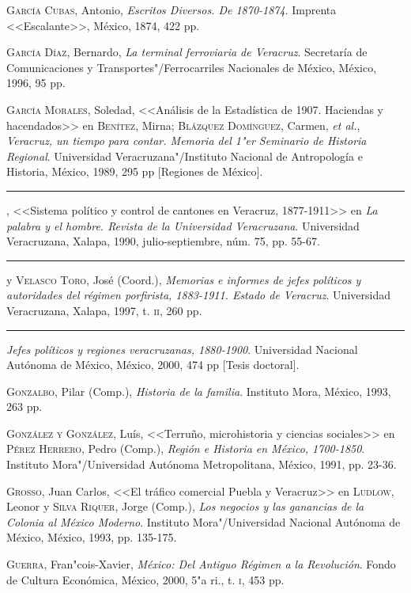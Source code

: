 \documentclass[14pt,twoside,final]{extbook} %
\begin{document}
\textsc{García Cubas}, Antonio, \emph{Escritos Diversos. De 1870-1874}. Imprenta <<Escalante>>, México, 1874, 422 pp.

\textsc{García Díaz}, Bernardo, \emph{La terminal ferroviaria de Veracruz}. Secretaría de Comunicaciones y Transportes"/Ferrocarriles Nacionales de México, México, 1996, 95 pp.

\textsc{García Morales}, Soledad, <<Análisis de la Estadística de 1907. Haciendas y
hacendados>> en \textsc{Benítez}, Mirna; \textsc{Blázquez Domínguez}, Carmen,
\emph{et al.}, \emph{Veracruz, un tiempo para contar. Memoria del 1"er Seminario de Historia Regional}. Universidad Veracruzana"/Instituto Nacional de Antropología e Historia, México, 1989, 295 pp [Regiones de México].

\rule{1cm}{0.4pt}, <<Sistema político y control de cantones en Veracruz, 1877-1911>> en \emph{La palabra y el hombre. Revista de la Universidad Veracruzana}. Universidad Veracruzana, Xalapa, 1990, julio-septiembre, núm. 75, pp. 55-67.

\rule{1cm}{0.4pt} y \textsc{Velasco Toro}, José (Coord.), \emph{Memorias e informes de jefes políticos y autoridades del régimen porfirista, 1883-1911. Estado de Veracruz}. Universidad
Veracruzana, Xalapa, 1997, t. \textsc{ii}, 260 pp.

\rule{1cm}{0.4pt} \emph{Jefes políticos y regiones veracruzanas, 1880-1900}. Universidad Nacional Autónoma de México, México, 2000, 474 pp [Tesis doctoral].

\textsc{Gonzalbo}, Pilar (Comp.), \emph{Historia de la familia}. Instituto Mora, México, 1993, 263 pp.

\textsc{González y González}, Luís, <<Terruño, microhistoria y ciencias sociales>> en \textsc{Pérez Herrero}, Pedro (Comp.), \emph{Región e Historia en México, \mbox{1700-1850}}. Instituto Mora"/Universidad Autónoma Metropolitana, México, 1991, pp. 23-36.

\textsc{Grosso}, Juan Carlos, <<El tráfico comercial Puebla y Veracruz>> en \textsc{Ludlow}, Leonor y \textsc{Silva Riquer}, Jorge (Comp.), \emph{Los negocios y las ganancias de la Colonia al México Moderno}. Instituto Mora"/Universidad Nacional Autónoma de México, México, 1993, pp. 135-175.

\textsc{Guerra}, Fran"cois-Xavier, \emph{México: Del Antiguo Régimen a la Revolución}. Fondo de Cultura Económica, México, 2000, 5"a ri., t. \textsc{i}, 453 pp.
\end{document}
